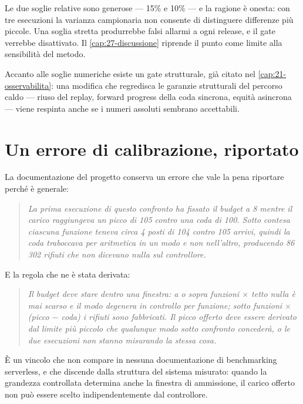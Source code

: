 Le due soglie relative sono generose --- 15\% e 10\% --- e la ragione \`e onesta:
con tre esecuzioni la varianza campionaria non consente di distinguere
differenze pi\`u piccole. Una soglia stretta produrrebbe falsi allarmi a ogni
release, e il gate verrebbe disattivato. Il \cref{cap:27-discussione} riprende
il punto come limite alla sensibilit\`a del metodo.

Accanto alle soglie numeriche esiste un gate strutturale, gi\`a citato nel
\cref{cap:21-osservabilita}: una modifica che regredisca le garanzie
strutturali del percorso caldo --- riuso del replay, forward progress della coda
sincrona, equit\`a asincrona --- viene respinta anche se i numeri assoluti
sembrano accettabili.

\section{Un errore di calibrazione, riportato}

La documentazione del progetto conserva un errore che vale la pena riportare
perch\'e \`e generale:

\begin{quote}\itshape
La prima esecuzione di questo confronto ha fissato il budget a 8 mentre il carico
raggiungeva un picco di 105 contro una coda di 100. Sotto contesa ciascuna
funzione teneva circa 4 posti di 104 contro 105 arrivi, quindi la coda traboccava
per aritmetica in un modo e non nell'altro, producendo 86\,302 rifiuti che non
dicevano nulla sul controllore.
\end{quote}

E la regola che ne \`e stata derivata:

\begin{quote}\itshape
Il budget deve stare dentro una finestra: a o sopra \emph{funzioni $\times$
tetto} nulla \`e mai scarso e il modo degenera in controllo per funzione; sotto
\emph{funzioni $\times$ (picco $-$ coda)} i rifiuti sono fabbricati. Il picco
offerto deve essere derivato dal limite pi\`u piccolo che qualunque modo sotto
confronto conceder\`a, o le due esecuzioni non stanno misurando la stessa cosa.
\end{quote}

\`E un vincolo che non compare in nessuna documentazione di benchmarking
serverless, e che discende dalla struttura del sistema misurato: quando la
grandezza controllata determina anche la finestra di ammissione, il carico
offerto non pu\`o essere scelto indipendentemente dal controllore.

